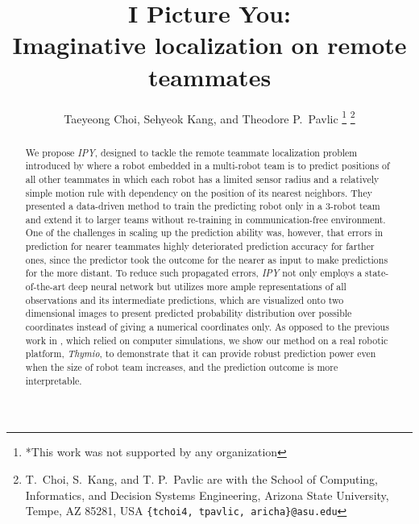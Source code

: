 \documentclass[letterpaper, 10 pt, conference]{ieeeconf}  %
\title{\LARGE \bf
	I Picture You: \\
	Imaginative localization on remote teammates
}
\author{Taeyeong Choi, Sehyeok Kang, and Theodore P.~Pavlic %
	\thanks{*This work was not supported by any organization}%
	\thanks{T.~Choi, S.~Kang, and T. P.~Pavlic are with the School of Computing, Informatics, and Decision Systems Engineering,
		Arizona State University, Tempe, AZ 85281, USA
		{\tt\small \{tchoi4, tpavlic, aricha\}@asu.edu}}%
}
\begin{document}
	
	
	
	\maketitle
	\thispagestyle{empty}
	\pagestyle{empty}
	
	
	\begin{abstract}
		
%		
%		

		We propose \emph{IPY}, designed to tackle the remote teammate localization problem
		introduced 
		by \cite{Choi17} where a robot embedded in a multi-robot team is to predict positions 
		of all other teammates in which each robot has a limited sensor radius and a 
		relatively simple motion rule with dependency on the position of its nearest neighbors. 
		They presented a data-driven method to train the predicting robot only in 
		a 3-robot team and extend it to larger teams without re-training in 
		communication-free environment. 
		One of the challenges in scaling up the prediction ability was, however, that
		errors in prediction for nearer teammates highly deteriorated prediction accuracy 
		for farther ones, since the predictor took the outcome for the nearer as input to make
		predictions for the more distant. 
		To reduce such propagated errors, \emph{IPY} not only employs a state-of-the-art deep
		neural network but utilizes more ample representations of all observations and its 
		intermediate predictions, which are visualized onto two dimensional images to 
		present predicted probability distribution over possible coordinates instead of 
		giving a numerical coordinates only. 
		As opposed to the previous work in \cite{Choi17}, which relied on computer simulations, 
		we show our method on a real robotic platform, \emph{Thymio}, to demonstrate that 
		it can provide robust prediction power even when the size of robot team increases, and 
		the prediction outcome is more interpretable.  
		

\end{abstract}
\end{document}
